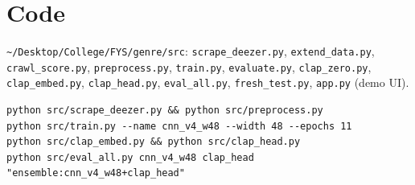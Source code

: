 \documentclass[11pt]{article}
\begin{document}
\section*{Code}
\texttt{\textasciitilde/Desktop/College/FYS/genre/src}: \texttt{scrape\_deezer.py}, \texttt{extend\_data.py}, \texttt{crawl\_score.py}, \texttt{preprocess.py}, \texttt{train.py}, \texttt{evaluate.py}, \texttt{clap\_zero.py}, \texttt{clap\_embed.py}, \texttt{clap\_head.py}, \texttt{eval\_all.py}, \texttt{fresh\_test.py}, \texttt{app.py} (demo UI).
\begin{lstlisting}
python src/scrape_deezer.py && python src/preprocess.py
python src/train.py --name cnn_v4_w48 --width 48 --epochs 11
python src/clap_embed.py && python src/clap_head.py
python src/eval_all.py cnn_v4_w48 clap_head "ensemble:cnn_v4_w48+clap_head"
\end{lstlisting}
\end{document}
